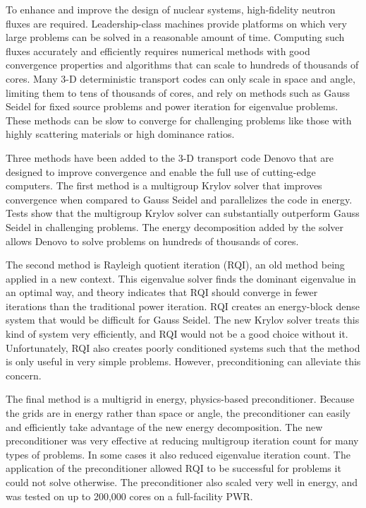 
\noindent       %
To enhance and improve the design of nuclear systems, high-fidelity neutron fluxes are required. Leadership-class machines provide platforms on which very large problems can be solved in a reasonable amount of time. Computing such fluxes accurately and efficiently requires numerical methods with good convergence properties and algorithms that can scale to hundreds of thousands of cores. Many 3-D deterministic transport codes can only scale in space and angle, limiting them to tens of thousands of cores, and rely on methods such as Gauss Seidel for fixed source problems and power iteration for eigenvalue problems. These methods can be slow to converge for challenging problems like those with highly scattering materials or high dominance ratios. 

\vspace*{0.5em}
\noindent       %
Three methods have been added to the 3-D \Sn transport code Denovo that are designed to improve convergence and enable the full use of cutting-edge computers. The first method is a multigroup Krylov solver that improves convergence when compared to Gauss Seidel and parallelizes the code in energy. Tests show that the multigroup Krylov solver can substantially outperform Gauss Seidel in challenging problems. The energy decomposition added by the solver allows Denovo to solve problems on hundreds of thousands of cores. 

\vspace*{0.5em}
\noindent       %
The second method is Rayleigh quotient iteration (RQI), an old method being applied in a new context. This eigenvalue solver finds the dominant eigenvalue in an optimal way, and theory indicates that RQI should converge in fewer iterations than the traditional power iteration. RQI creates an energy-block dense system that would be difficult for Gauss Seidel. The new Krylov solver treats this kind of system very efficiently, and RQI would not be a good choice without it. Unfortunately, RQI also creates poorly conditioned systems such that the method is only useful in very simple problems. However, preconditioning can alleviate this concern. 

\vspace*{0.5em}
\noindent       %
The final method is a multigrid in energy, physics-based preconditioner. Because the grids are in energy rather than space or angle, the preconditioner can easily and efficiently take advantage of the new energy decomposition. The new preconditioner was very effective at reducing multigroup iteration count for many types of problems. In some cases it also reduced eigenvalue iteration count. The application of the preconditioner allowed RQI to be successful for problems it could not solve otherwise. The preconditioner also scaled very well in energy, and was tested on up to 200,000 cores on a full-facility PWR.

